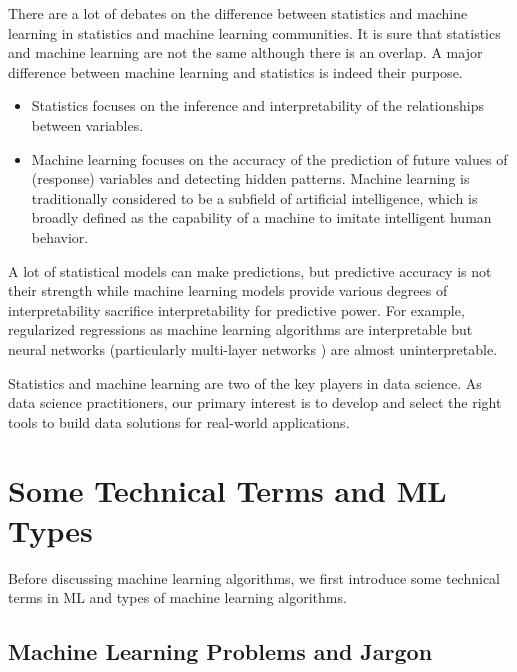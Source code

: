\documentclass[
]{book}
\begin{document}
There are a lot of debates on the difference between statistics and machine learning in statistics and machine learning communities. It is sure that statistics and machine learning are not the same although there is an overlap. A major difference between machine learning and statistics is indeed their purpose.

\begin{itemize}
\item
  Statistics focuses on the inference and interpretability of the relationships between variables.
\item
  Machine learning focuses on the accuracy of the prediction of future values of (response) variables and detecting hidden patterns. Machine learning is traditionally considered to be a subfield of artificial intelligence, which is broadly defined as the capability of a machine to imitate intelligent human behavior.
\end{itemize}

A lot of statistical models can make predictions, but predictive accuracy is not their strength while machine learning models provide various degrees of interpretability sacrifice interpretability for predictive power. For example, regularized regressions as machine learning algorithms are interpretable but neural networks (particularly multi-layer networks ) are almost uninterpretable.

Statistics and machine learning are two of the key players in data science. As data science practitioners, our primary interest is to develop and select the right tools to build data solutions for real-world applications.

\hypertarget{some-technical-terms-and-ml-types}{%
\section{Some Technical Terms and ML Types}\label{some-technical-terms-and-ml-types}}

Before discussing machine learning algorithms, we first introduce some technical terms in ML and types of machine learning algorithms.

\hypertarget{machine-learning-problems-and-jargon}{%
\subsection{Machine Learning Problems and Jargon}\label{machine-learning-problems-and-jargon}}
\end{document}
